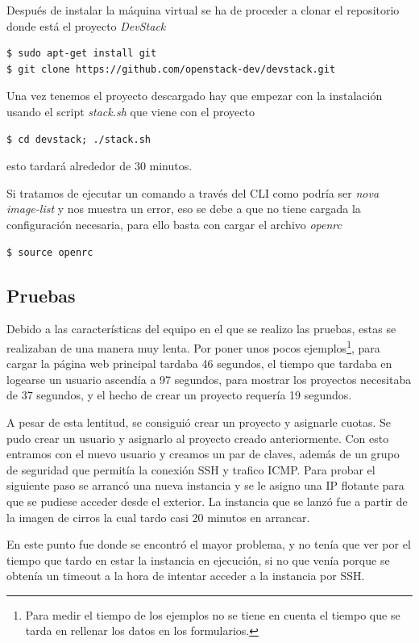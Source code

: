 \documentclass{article}
\begin{document}
	Después de instalar la máquina virtual se ha de proceder a clonar el repositorio donde está el proyecto \emph{DevStack}
\begin{lstlisting}[style=miniBash]
$ sudo apt-get install git
$ git clone https://github.com/openstack-dev/devstack.git
\end{lstlisting}	

	Una vez tenemos el proyecto descargado hay que empezar con la instalación usando el script \emph{stack.sh} que viene con el proyecto
\begin{lstlisting}[style=miniBash]
$ cd devstack; ./stack.sh
\end{lstlisting}	
	esto tardará alrededor de 30 minutos.
	
	Si tratamos de ejecutar un comando a través del CLI como podría ser \emph{nova image-list} y nos muestra un error, eso se debe a que no tiene cargada la configuración necesaria, para ello basta con cargar el archivo \emph{openrc}
\begin{lstlisting}[style=miniBash]
$ source openrc
\end{lstlisting}		

\subsection{Pruebas}
	Debido a las características del equipo en el que se realizo las pruebas, estas se realizaban de una manera muy lenta. Por poner unos pocos ejemplos\footnote{Para medir el tiempo de los ejemplos no se tiene en cuenta el tiempo que se tarda en rellenar los datos en los formularios.}, para cargar la página web principal tardaba 46 segundos, el tiempo que tardaba en logearse un usuario ascendía a 97 segundos, para mostrar los proyectos necesitaba de 37 segundos, y el hecho de crear un proyecto requería 19 segundos.
	
	A pesar de esta lentitud, se consiguió crear un proyecto y asignarle cuotas. Se pudo crear un usuario y asignarlo al proyecto creado anteriormente. Con esto entramos con el nuevo usuario y creamos un par de claves, además de un grupo de seguridad que permitía la conexión SSH y trafico ICMP. Para probar el siguiente paso se arrancó una nueva instancia y se le asigno una IP flotante para que se pudiese acceder desde el exterior. La instancia que se lanzó fue a partir de la imagen de cirros la cual tardo casi 20 minutos en arrancar.
	
	En este punto fue donde se encontró el mayor problema, y no tenía que ver por el tiempo que tardo en estar la instancia en ejecución, si no que venía porque se obtenía un timeout a la hora de intentar acceder a la instancia por SSH.
\end{document}
